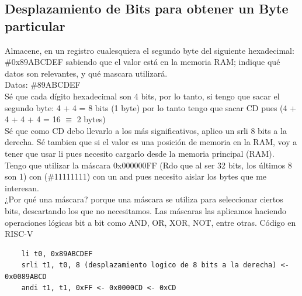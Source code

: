 \documentclass[10pt,a4paper]{article}
\begin{document}
\subsection*{Desplazamiento de Bits para obtener un Byte particular}
\label{subsec:desplazamiento_bits}
Almacene, en un registro cualesquiera el segundo byte del siguiente hexadecimal: \#0x89ABCDEF sabiendo que el valor está en la memoria RAM; indique qué datos son relevantes, y qué mascara utilizará. \\
Datos: \#89ABCDEF \\
Sé que cada dígito hexadecimal son 4 bits, por lo tanto, si tengo que sacar el segundo byte: 4 + 4 = 8 bits (1 byte) por lo tanto tengo que sacar CD pues (4 + 4 + 4 + 4 = 16 $ \equiv $ 2 bytes) \\
Sé que como CD debo llevarlo a los más significativos, aplico un srli 8 bits a la derecha.
Sé tambien que si el valor es una posición de memoria en la RAM, voy a tener que usar li pues necesito cargarlo desde la memoria principal (RAM). \\
Tengo que utilizar la máscara 0x000000FF (Rdo que al ser 32 bits, los últimos 8 son 1) con (\#11111111) con un and pues necesito aislar los bytes que me interesan. \\
¿Por qué una máscara? porque una máscara se utiliza para seleccionar ciertos bits, descartando los que no necesitamos. Las máscaras las aplicamos haciendo operaciones lógicas bit a bit como AND, OR, XOR, NOT, entre otras.
Código en RISC-V
\begin{lstlisting}
    li t0, 0x89ABCDEF
    srli t1, t0, 8 (desplazamiento logico de 8 bits a la derecha) <- 0x0089ABCD
    andi t1, t1, 0xFF <- 0x0000CD <- 0xCD
\end{lstlisting}
\end{document}
